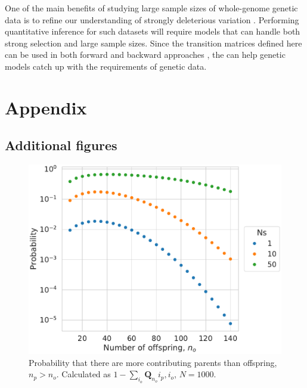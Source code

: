 \documentclass[review]{elsarticle}
\begin{document}
One of the main benefits of studying large sample sizes of whole-genome
genetic data is to refine our understanding of strongly deleterious variation \cite{karczewski2020mutational}. Performing 
quantitative inference for such datasets will require models that can handle both strong selection and large sample sizes.  
Since the transition matrices defined here can be used in both forward \citep{JouganousEtAl2017} 
and backward approaches \cite{KammEtAl2017}, the can help genetic models catch up with the requirements of genetic data.




\section{Appendix}

\subsection{Additional figures}
\label{subsec_apx_figures}


\begin{figure}
  \centering
  \includegraphics[width=\textwidth]{fig/missing.pdf}
  \caption{Probability that there are more contributing parents than offspring, $n_p > n_o$.
    Calculated as $1-\sum_{i_o} \mathbf{Q}_{n_o}{i_p, i_o}$, $N=1000$.}
  \label{fig_apx_missing}
\end{figure}
\end{document}
